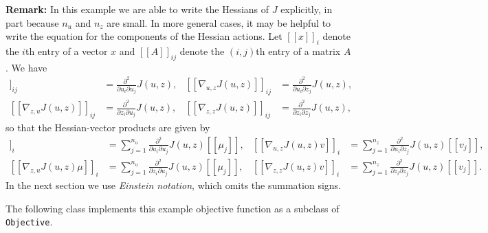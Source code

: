 \documentclass{article}
\begin{document}
\noindent\textbf{Remark:}
In this example we are able to write the Hessians of $J$ explicitly, in part because $n_{u}$ and $n_{z}$ are small.
In more general cases, it may be helpful to write the equation for the components of the Hessian actions.
Let $[\![x]\!]_{i}$ denote the $i$th entry of a vector $x$ and $[\![A]\!]_{ij}$ denote the $(i,j)$th entry of a matrix $A$.
We have
\begin{align*}
    [\![\nabla_{u,u}J(u, z)]\!]_{ij}
    &= \frac{\partial^{2}}{\partial u_{i}\partial u_{j}}J(u, z),
    &
    [\![\nabla_{u,z}J(u, z)]\!]_{ij}
    &= \frac{\partial^{2}}{\partial u_{i}\partial z_{j}}J(u, z),
    \\
    [\![\nabla_{z,u}J(u, z)]\!]_{ij}
    &= \frac{\partial^{2}}{\partial z_{i}\partial u_{j}}J(u, z),
    &
    [\![\nabla_{z,z}J(u, z)]\!]_{ij}
    &= \frac{\partial^{2}}{\partial z_{i}\partial z_{j}}J(u, z),
\end{align*}
so that the Hessian-vector products are given by
\begin{align*}
    [\![\nabla_{u,u}J(u, z)\mu]\!]_{i}
    &= \sum_{j=1}^{n_{u}}\frac{\partial^{2}}{\partial u_{i}\partial u_{j}}J(u, z)[\![\mu_{j}]\!],
    &
    [\![\nabla_{u,z}J(u, z)v]\!]_{i}
    &= \sum_{j=1}^{n_{z}}\frac{\partial^{2}}{\partial u_{i}\partial z_{j}}J(u, z)[\![v_{j}]\!],
    \\
    [\![\nabla_{z,u}J(u, z)\mu]\!]_{i}
    &= \sum_{j=1}^{n_{u}}\frac{\partial^{2}}{\partial z_{i}\partial u_{j}}J(u, z)[\![\mu_{j}]\!],
    &
    [\![\nabla_{z,z}J(u, z)v]\!]_{i}
    &= \sum_{j=1}^{n_{z}}\frac{\partial^{2}}{\partial z_{i}\partial z_{j}}J(u, z) [\![v_{j}]\!].
\end{align*}
In the next section we use \emph{Einstein notation}, which omits the summation signs.

\vspace{.25in}

The following class implements this example objective function as a subclass of \texttt{Objective}.


\end{document}
